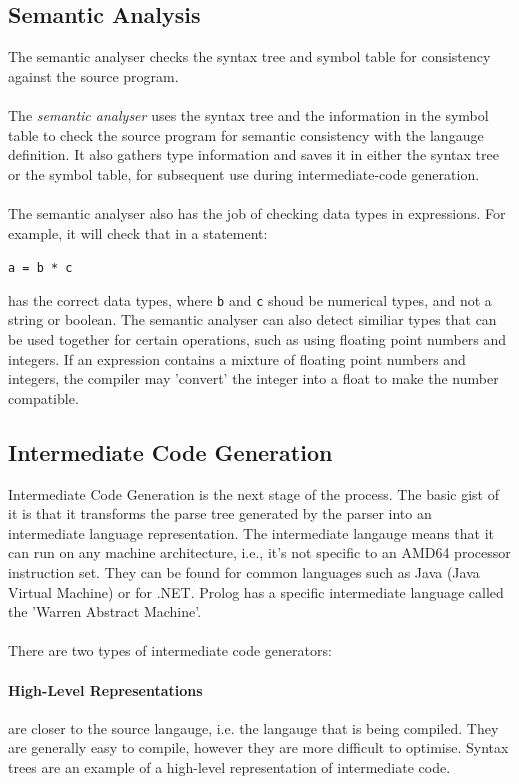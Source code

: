 \documentclass[12pt]{report}
\begin{document}
\subsection{Semantic Analysis}\label{subsec:syntax_trees}
The semantic analyser checks the syntax tree and symbol table for consistency against the source program.\\
\\
The \textit{semantic analyser} uses the syntax tree and the information in the symbol table to check the source program for semantic consistency with the langauge definition.  It also gathers type information and saves it in either the syntax tree or the symbol table, for subsequent use during intermediate-code generation. \citep{compilers07}\\
\\
The semantic analyser also has the job of checking data types in expressions.  For example, it will check that in a statement:
\begin{center}
	\texttt{a = b * c}\\
\end{center}
has the correct data types, where \texttt{b} and \texttt{c} shoud be numerical types, and not a string or boolean.  The semantic analyser can also detect similiar types that can be used together for certain operations, such as using floating point numbers and integers.  If an expression contains a mixture of floating point numbers and integers, the compiler may 'convert' the integer into a float to make the number compatible.
\subsection{Intermediate Code Generation}\label{subsec:intermediate_code_gen}
Intermediate Code Generation is the next stage of the process.  The basic gist of it is that it transforms the parse tree generated by the parser into an intermediate language representation.  The intermediate langauge means that it can run on any machine architecture, i.e., it's not specific to an AMD64 processor instruction set.  They can be found for common languages such as Java (Java Virtual Machine) or for .NET.  Prolog has a specific intermediate language called the 'Warren Abstract Machine'.\\
\\
There are two types of intermediate code generators:
\paragraph{High-Level Representations} are closer to the source langauge, i.e. the langauge that is being compiled.  They are generally easy to compile, however they are more difficult to optimise.  Syntax trees are an example of a high-level representation of intermediate code.
\end{document}
